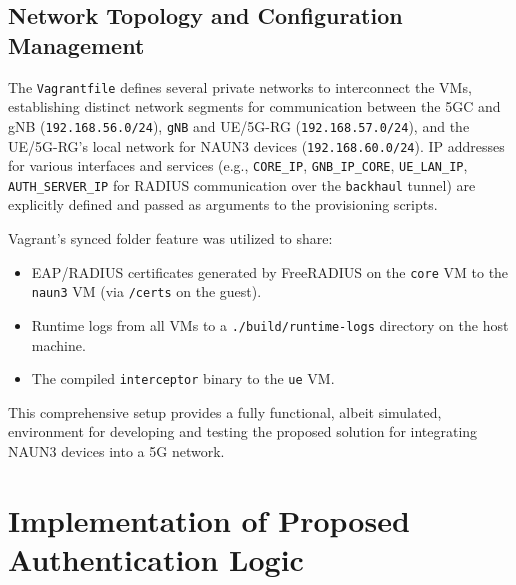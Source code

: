 \subsection{Network Topology and Configuration Management}


The \texttt{Vagrantfile} defines several private networks to interconnect the \acp{VM}, establishing distinct network segments for communication between the \ac{5GC} and \ac{gNB} (\texttt{192.168.56.0/24}), \texttt{gNB} and \ac{UE}/\ac{5G-RG} (\texttt{192.168.57.0/24}), and the \ac{UE}/\ac{5G-RG}'s local network for \ac{NAUN3} devices (\texttt{192.168.60.0/24}). \ac{IP} addresses for various interfaces and services (e.g., \texttt{CORE\_IP}, \texttt{GNB\_IP\_CORE}, \texttt{UE\_LAN\_IP}, \texttt{AUTH\_SERVER\_IP} for \ac{RADIUS} communication over the \texttt{backhaul} tunnel) are explicitly defined and passed as arguments to the provisioning scripts.

Vagrant's synced folder feature was utilized to share:

\begin{itemize}
    \item \ac{EAP}/\ac{RADIUS} certificates generated by FreeRADIUS on the \texttt{core} \ac{VM} to the \texttt{naun3} \ac{VM} (via \texttt{/certs} on the guest).

    \item Runtime logs from all \acp{VM} to a \texttt{./build/runtime-logs} directory on the host machine.

    \item The compiled \texttt{interceptor} binary to the \texttt{ue} \ac{VM}.
\end{itemize}

This comprehensive setup provides a fully functional, albeit simulated, environment for developing and testing the proposed solution for integrating \ac{NAUN3} devices into a \ac{5G} network.

\section{Implementation of Proposed Authentication Logic}



